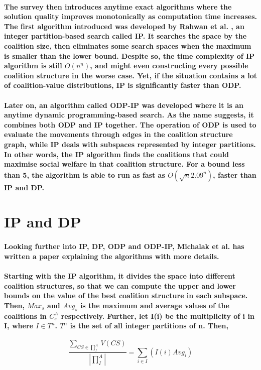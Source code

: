 \documentclass[11pt]{report}
\begin{document}
\paragraph{The survey then introduces anytime exact algorithms where the solution quality improves monotonically as computation time increases. The first algorithm introduced was developed by Rahwan et al. \cite{rahwan2009anytime}, an integer partition-based search called IP. It searches the space by the coalition size, then eliminates some search spaces when the maximum is smaller than the lower bound. Despite so, the time complexity of IP algorithm is still $O(n^n)$, and might even constructing every possible coalition structure in the worse case. Yet, if the situation contains a lot of coalition-value distributions, IP is significantly faster than ODP. }

\paragraph{Later on, an algorithm called ODP-IP was developed where it is an anytime dynamic programming-based search. As the name suggests, it combines both ODP and IP together. The operation of ODP is used to evaluate the movements through edges in the coalition structure graph, while IP deals with subspaces represented by integer partitions. In other words, the IP algorithm finds the coalitions that could maximise social welfare in that coalition structure. For a bound less than 5, the algorithm is able to run as fast as $O(\sqrt{n}2.09^n)$, faster than IP and DP. } 


\section{IP and DP}

\paragraph{Looking further into IP, DP, ODP and ODP-IP, Michalak et al.\cite{michalak2016hybrid} has written a paper explaining the algorithms with more details. }
\paragraph{Starting with the IP algorithm, it divides the space into different coalition structures, so that we can compute the upper and lower bounds on the value of the best coalition structure in each subspace. Then, $Max_s$ and $Avg_s$ is the maximum and average values of the coalitions in $C_s^A$ respectively. Further, let I(i) be the multiplicity of i in I, where $I\in T^n$. $T^n$ is the set of all integer partitions of n. Then, }
\[\frac{\sum_{CS\in \prod_I^A} V(CS)}{|\prod_I^A|}=\sum_{i\in I}(I(i)Avg_i) \]
\end{document}
